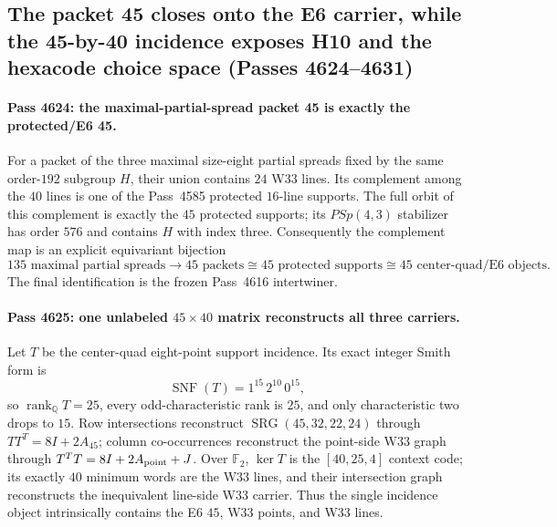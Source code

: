 \subsection{The packet 45 closes onto the E6 carrier, while the 45-by-40 incidence exposes H10 and the hexacode choice space (Passes 4624--4631)}
\label{sec:pass4624-4631-packet-incidence-f4}

\paragraph{Pass 4624: the maximal-partial-spread packet 45 is exactly the protected/E6 45.}
For a packet of the three maximal size-eight partial spreads fixed by the same
order-$192$ subgroup $H$, their union contains $24$ W33 lines.  Its complement
among the $40$ lines is one of the Pass~4585 protected $16$-line supports.
The full orbit of this complement is exactly the $45$ protected supports; its
$PSp(4,3)$ stabilizer has order $576$ and contains $H$ with index three.
Consequently the complement map is an explicit equivariant bijection
\[
 135\text{ maximal partial spreads}\longrightarrow45\text{ packets}
 \cong45\text{ protected supports}\cong45\text{ center-quad/E6 objects}.
\]
The final identification is the frozen Pass~4616 intertwiner.

\paragraph{Pass 4625: one unlabeled $45\times40$ matrix reconstructs all three carriers.}
Let $T$ be the center-quad eight-point support incidence.  Its exact integer
Smith form is
\[
 \boxed{\operatorname{SNF}(T)=1^{15}\,2^{10}\,0^{15}},
\]
so $\operatorname{rank}_{\mathbb Q}T=25$, every odd-characteristic rank is $25$,
and only characteristic two drops to $15$.  Row intersections reconstruct
$\operatorname{SRG}(45,32,22,24)$ through $TT^T=8I+2A_{45}$; column
co-occurrences reconstruct the point-side W33 graph through
$T^TT=8I+2A_{\rm point}+J$.  Over $\mathbb F_2$, $\ker T$ is the
$[40,25,4]$ context code; its exactly $40$ minimum words are the W33 lines,
and their intersection graph reconstructs the inequivalent line-side W33
carrier.  Thus the single incidence object intrinsically contains the E6 $45$,
W33 points, and W33 lines.


